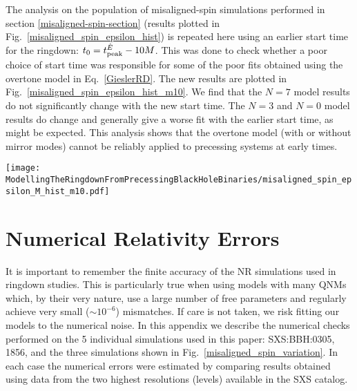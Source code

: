 The analysis on the population of misaligned-spin simulations performed in section \ref{misaligned-spin-section} (results plotted in Fig.~\ref{misaligned_spin_epsilon_hist}) is repeated here using an earlier start time for the ringdown: $t_0=t^{\dot{E}}_{\rm peak}-10M$.
This was done to check whether a poor choice of start time was responsible for some of the poor fits obtained using the overtone model in Eq.~\ref{GieslerRD}.
The new results are plotted in Fig.~\ref{misaligned_spin_epsilon_hist_m10}.
We find that the $N=7$ model results do not significantly change with the new start time.
The $N=3$ and $N=0$ model results do change and generally give a worse fit with the earlier start time, as might be expected. This analysis shows that the overtone model (with or without mirror modes) cannot be reliably applied to precessing systems at early times. 

\begin{figure*}[h]
    \centering
    \texttt{[image: ModellingTheRingdownFromPrecessingBlackHoleBinaries/misaligned\_spin\_epsilon\_M\_hist\_m10.pdf]}
    \caption[Remnant error and mismatches for fits to misaligned-spin SXS simulations using the overtone model starting from $10M$ before the peak of the $h_{22}$ strain]{
    Left: histograms of the mass-spin remnant error $\epsilon$ from an overtone model fit to the rotated $h'_{22}$ mode of 252 misaligned-spin SXS simulations for several different overtone numbers $N$. 
    Right: histograms of the mismatch from a fit with the true remnant mass and spin parameters, with the same overtone models and SXS simulations as in the left histogram.
    These results are similar to those in Fig.~\ref{misaligned_spin_epsilon_hist} in the main text, but use a start time that is earlier by $10M$.
    The solid histograms show results from fits performed starting $10M$ before the peak of the energy flux with $N$ overtones of the fundamental $\ell = m = 2$ mode.
    The red dashed line shows results from a $N=7$ model that also includes mirror modes and was fitted with a ringdown starting $15M$ before the peak in the energy flux.
    }
    \label{misaligned_spin_epsilon_hist_m10}
\end{figure*} 


\section{Numerical Relativity Errors}\label{NR_error_appendix}

It is important to remember the finite accuracy of the NR simulations used in ringdown studies.
This is particularly true when using models with many QNMs which, by their very nature, use a large number of free parameters and regularly achieve very small ($\sim 10^{-6}$) mismatches.
If care is not taken, we risk fitting our models to the numerical noise. 
In this appendix we describe the numerical checks performed on the 5 individual simulations used in this paper: SXS:BBH:0305, 1856, and the three simulations shown in Fig.~\ref{misaligned_spin_variation}.
In each case the numerical errors were estimated by comparing results obtained using data from the two highest resolutions (levels) available in the SXS catalog. 

